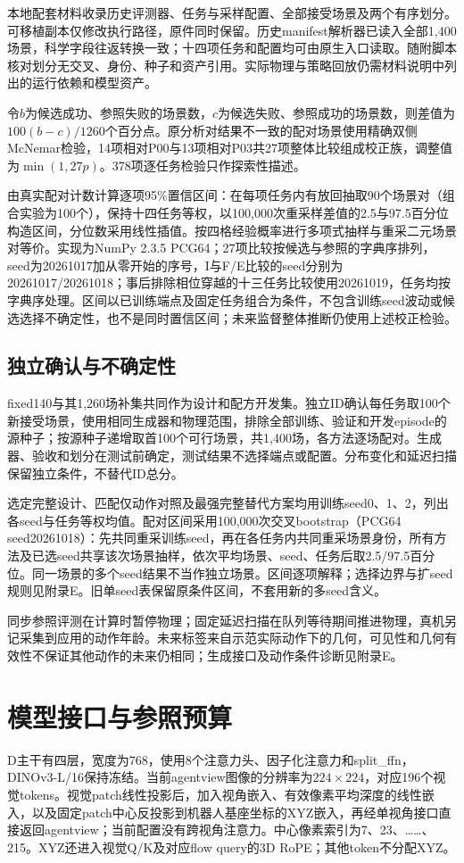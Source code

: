 本地配套材料收录历史评测器、任务与采样配置、全部接受场景及两个有序划分。可移植副本仅修改执行路径，原件同时保留。历史manifest解析器已读入全部1,400场景，科学字段往返转换一致；十四项任务和配置均可由原生入口读取。随附脚本核对划分无交叉、身份、种子和资产引用。实际物理与策略回放仍需材料说明中列出的运行依赖和模型资产。

令$b$为候选成功、参照失败的场景数，$c$为候选失败、参照成功的场景数，则差值为$100(b-c)/1260$个百分点。原分析对结果不一致的配对场景使用精确双侧McNemar检验，14项相对P00与13项相对P03共27项整体比较组成校正族，调整值为$\min(1,27p)$。378项逐任务检验只作探索性描述。

由真实配对计数计算逐项95\%置信区间：在每项任务内有放回抽取90个场景对（组合实验为100个），保持十四任务等权，以100,000次重采样差值的2.5与97.5百分位构造区间，分位数采用线性插值。按四格经验概率进行多项式抽样与重采二元场景对等价。实现为NumPy 2.3.5 PCG64；27项比较按候选与参照的字典序排列，seed为20261017加从零开始的序号，I与F/E比较的seed分别为20261017/20261018；事后排除相位穿越的十三任务比较使用20261019，任务均按字典序处理。区间以已训练端点及固定任务组合为条件，不包含训练seed波动或候选选择不确定性，也不是同时置信区间；未来监督整体推断仍使用上述校正检验。

\subsection{独立确认与不确定性}
\label{app:confirmation_protocol}
fixed140与其1,260场补集共同作为设计和配方开发集。独立ID确认每任务取100个新接受场景，使用相同生成器和物理范围，排除全部训练、验证和开发episode的源种子；按源种子递增取首100个可行场景，共1,400场，各方法逐场配对。生成器、验收和划分在测试前确定，测试结果不选择端点或配置。分布变化和延迟扫描保留独立条件，不替代ID总分。

选定完整设计、匹配仅动作对照及最强完整替代方案均用训练seed0、1、2，列出各seed与任务等权均值。配对区间采用100,000次交叉bootstrap（PCG64 seed20261018）：先共同重采训练seed，再在各任务内共同重采场景身份，所有方法及已选seed共享该次场景抽样，依次平均场景、seed、任务后取2.5/97.5百分位。同一场景的多个seed结果不当作独立场景。区间逐项解释；选择边界与扩seed规则见附录E。旧单seed表保留原条件区间，不套用新的多seed含义。

同步参照评测在计算时暂停物理；固定延迟扫描在队列等待期间推进物理，真机另记采集到应用的动作年龄。未来标签来自示范实际动作下的几何，可见性和几何有效性不保证其他动作的未来仍相同；生成接口及动作条件诊断见附录E。

\section{模型接口与参照预算}
\label{app:implementation}
D主干有四层，宽度为768，使用8个注意力头、因子化注意力和split\_ffn，DINOv3-L/16保持冻结。当前agentview图像的分辨率为$224\times224$，对应196个视觉tokens。视觉patch线性投影后，加入视角嵌入、有效像素平均深度的线性嵌入，以及固定patch中心反投影到机器人基座坐标的XYZ嵌入，再经单视角接口直接返回agentview；当前配置没有跨视角注意力。中心像素索引为7、23、……、215。XYZ还进入视觉Q/K及对应flow query的3D RoPE；其他token不分配XYZ。

